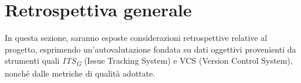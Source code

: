 \section{Retrospettiva generale}
In questa sezione, saranno esposte considerazioni retrospettive relative al progetto, esprimendo un'autovalutazione fondata su dati oggettivi provenienti da strumenti quali \textit{ITS}\textsubscript{\textit{G}} (Issue Tracking System) e VCS (Version Control System), nonché dalle metriche di qualità adottate. 




